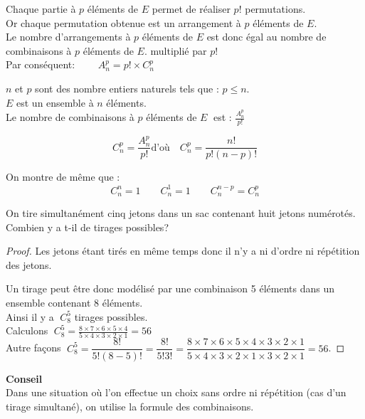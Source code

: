 Chaque partie à $ p $ éléments de $ E $ permet de réaliser $ p! $ permutations.\\
Or chaque permutation obtenue est un arrangement à $ p $ éléments de $ E $.\\
Le nombre d'arrangements à $ p $ éléments de $ E $ est donc égal au nombre de combinaisons à $ p $ éléments de $ E.$ multiplié par $ p! $ \\
Par conséquent:   $  \qquad A_{n}^{p}= p! \times C_{n}^{p}$
\begin{property}
$n $ et $ p$ sont des nombre entiers naturels tels que : $ p\leq n. $\\
$ E $ est un ensemble à $ n $ éléments.\\
Le nombre de combinaisons à $ p $ éléments de $ E\;$ est : $ \frac{A_{n}^{p}}{p!} $ 
\end{property}
\begin{notation}
\[ C_{n}^{p}=\dfrac{A_{n}^{p}}{p!} 
\textrm{d'où} \quad  C_{n}^{p}=\dfrac{n!}{p!(n-p)!} \]
\end{notation}
On montre de même que :\[C_{n}^{n}=1 \qquad  C_{n}^{1}=1  \qquad C_{n}^{n-p}= C_{n}^{p}  \]
\begin{exercice}
On tire simultanément cinq jetons dans un sac contenant huit jetons numérotés. Combien y a t-il de tirages possibles?
\end{exercice}
\begin{proof}
Les jetons étant tirés en même temps donc il n'y a ni d'ordre ni répétition des jetons.

Un tirage  peut être donc  modélisé par une combinaison 5 éléments dans un ensemble contenant 8 éléments. \\
Ainsi il y a $\; C_{8}^{5} $ tirages possibles.\\
Calculons  $ \; C_{8}^{5}= \frac{8 \times7 \times6\times 5\times 4}{5 \times4\times 3\times 2\times 1}=56 $ \\
Autre façons $\; C_{8}^{5}=\dfrac{8!}{5!(8-5)!}=\dfrac{8!}{5!3!}=\dfrac{8\times7\times6\times5\times4\times3\times2\times1}{5\times4\times3\times2\times1\times3\times2\times1}=56 $.
\end{proof}
\textbf{Conseil}\\
Dans une situation où l'on effectue un choix sans ordre ni répétition (cas d'un tirage simultané), on utilise  la formule des combinaisons.

